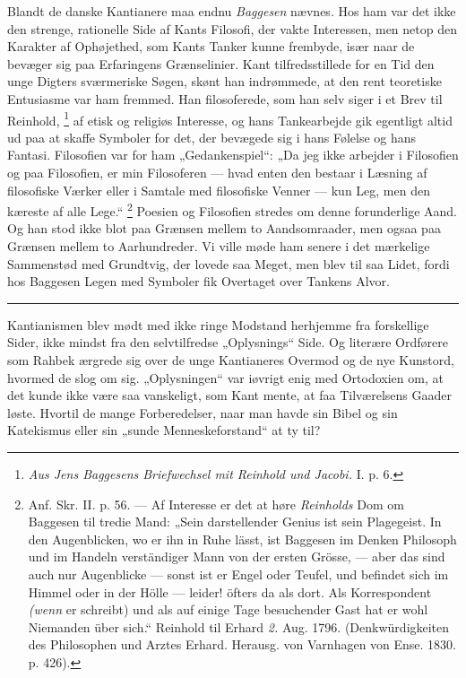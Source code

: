 \documentclass[12pt,a4paper,openany]{book}
\newcommand{\opage}[1]{\marginnote{\footnotesize\textit{[#1]}}}
\begin{document}
Blandt de danske Kantianere maa endnu \emph{Baggesen} nævnes. Hos ham var det
ikke den strenge, rationelle Side af Kants Filosofi, der vakte Interessen, men
netop den Karakter af Ophøjethed, som Kants Tanker kunne frembyde, især naar de
bevæger sig paa Erfaringens Grænselinier. Kant tilfredsstillede for en Tid den
unge Digters sværmeriske Søgen, skønt han indrømmede, at den rent teoretiske
Entusiasme var ham fremmed. Han filosoferede, som han selv siger i et Brev til
Reinhold,%
\footnote[2]{\textit{Aus Jens Baggesens Briefwechsel mit Reinhold und Jacobi.}
I. p. 6.} af etisk og religiøs Interesse, og hans Tankearbejde gik egentligt
altid ud paa at skaffe Symboler for det, der bevægede sig i hans Følelse og
hans Fantasi. Filosofien var for ham „Gedankenspiel“: „Da jeg ikke arbejder i
Filosofien og paa Filosofien, er min Filosoferen --- hvad enten den bestaar i
Læsning af filosofiske Værker eller i Samtale med filosofiske Venner --- kun
Leg, men den kæreste af alle Lege.“%
\footnote[3]{Anf. Skr. II. p. 56. --- Af Interesse er det at høre
\textit{Reinholds} Dom om Baggesen til tredie Mand: „Sein darstellender Genius
ist sein Plagegeist. In den Augenblicken, wo er ihn in Ruhe lässt, ist Baggesen
im Denken Philosoph und im Handeln verständiger Mann von der ersten Grösse, ---
aber das sind auch nur Augenblicke --- sonst ist er Engel oder Teufel, und
befindet sich im Himmel oder in der Hölle --- leider! öfters da als dort. Als
Korrespondent \textit{(wenn} er schreibt) und als auf einige Tage besuchender
Gast hat er wohl Niemanden über sich.“ Reinhold til Erhard \textit{2.} Aug.
1796. (Denkwürdigkeiten des Philosophen und Arztes Erhard. Herausg. von
Varnhagen von Ense. 1830. p. 426).} Poesien og Filosofien stredes om denne
forunderlige Aand. Og han stod ikke blot paa Grænsen mellem to Aandsomraader,
men ogsaa paa
\setcounter{footnote}{0}%
\opage{30}Grænsen mellem to Aarhundreder. Vi ville møde ham senere i det
mærkelige Sammenstød med Grundtvig, der lovede saa Meget, men blev til saa
Lidet, fordi hos Baggesen Legen med Symboler fik Overtaget over Tankens Alvor.

\begin{center}\rule{2cm}{0.4pt}\end{center}

Kantianismen blev mødt med ikke ringe Modstand herhjemme fra forskellige Sider,
ikke mindst fra den selvtilfredse „Oplysnings“ Side. Og literære Ordførere som
Rahbek ærgrede sig over de unge Kantianeres Overmod og de nye Kunstord, hvormed
de slog om sig. „Oplysningen“ var iøvrigt enig med Ortodoxien om, at det kunde
ikke være saa vanskeligt, som Kant mente, at faa Tilværelsens Gaader løste.
Hvortil de mange Forberedelser, naar man havde sin Bibel og sin Katekismus
eller sin „sunde Menneskeforstand“ at ty til?
\end{document}
